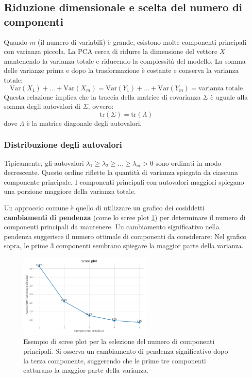 \subsection{Riduzione dimensionale e scelta del numero di componenti}

Quando \( m \) (il numero di variabili) è grande, esistono molte componenti
principali con varianza piccola. La PCA cerca di ridurre la dimensione del
vettore \( X \) mantenendo la varianza totale e riducendo la complessità del
modello. La somma delle varianze prima e dopo la trasformazione è costante e
conserva la varianza totale:
\[
\text{Var}(X_1) + \dots + \text{Var}(X_m) = \text{Var}(Y_1) + \dots +
\text{Var}(Y_m) = \text{varianza totale}
\]
Questa relazione implica che la traccia della matrice di covarianza \( \Sigma \)
è uguale alla somma degli autovalori di \( \Sigma \), ovvero:
\[
\text{tr}(\Sigma) = \text{tr}(\Lambda)
\]
dove \( \Lambda \) è la matrice diagonale degli autovalori.

\subsubsection{Distribuzione degli autovalori}

Tipicamente, gli autovalori \( \lambda_1 \geq \lambda_2 \geq \dots \geq
\lambda_m > 0 \) sono ordinati in modo decrescente. Questo ordine riflette la
quantità di varianza spiegata da ciascuna componente principale. I componenti
principali con autovalori maggiori spiegano una porzione maggiore della varianza
totale.

Un approccio comune è quello di utilizzare un grafico dei cosiddetti
\textbf{cambiamenti di pendenza} (come lo scree plot \ref{fig:screeplot}) per determinare il numero
di componenti principali da mantenere. Un cambiamento significativo nella
pendenza suggerisce il numero ottimale di componenti da considerare:
Nel grafico sopra, le prime 3 componenti sembrano spiegare la maggior parte
della varianza.

\begin{figure}[H]
    \centering
    \includegraphics[width=0.6\textwidth]{images/th_10_12/screeplot.png}
    \caption{Esempio di scree plot per la selezione del numero di componenti principali. Si osserva un cambiamento di pendenza significativo dopo la terza componente, suggerendo che le prime tre componenti catturano la maggior parte della varianza.}
    \label{fig:screeplot}
\end{figure}

